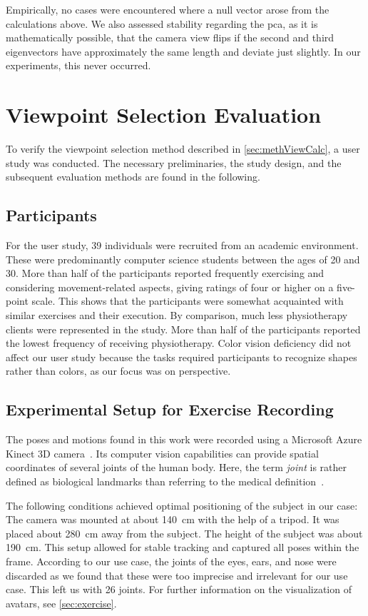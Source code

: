 Empirically, no cases were encountered where a null vector arose from the calculations above. We also assessed stability regarding the \acrshort{pca}, as it is mathematically possible, that the camera view flips if the second and third eigenvectors have approximately the same length and deviate just slightly. In our experiments, this never occurred.

\section{Viewpoint Selection Evaluation \label{sec:evaluation}}
To verify the viewpoint selection method described in \autoref{sec:methViewCalc}, a user study was conducted. The necessary preliminaries, the study design, and the subsequent evaluation methods are found in the following.

\subsection{Participants}
For the user study, 39 individuals were recruited from an academic environment. These were predominantly computer science students between the ages of 20 and 30. More than half of the participants reported frequently exercising and considering movement-related aspects, giving ratings of four or higher on a five-point scale. This shows that the participants were somewhat acquainted with similar exercises and their execution. By comparison, much less physiotherapy clients were represented in the study. More than half of the participants reported the lowest frequency of receiving physiotherapy. Color vision deficiency did not affect our user study because the tasks required participants to recognize shapes rather than colors, as our focus was on perspective.

\subsection{Experimental Setup for Exercise Recording\label{sec:recording}}
The poses and motions found in this work were recorded using a Microsoft Azure Kinect 3D camera~\cite{kinect:documentation}. Its computer vision capabilities can provide spatial coordinates of several joints of the human body. Here, the term \emph{joint} is rather defined as biological landmarks than referring to the medical definition~\cite{kinect:documentation}.

The following conditions achieved optimal positioning of the subject in our case: The camera was mounted at about 140~cm with the help of a tripod. It was placed about 280~cm away from the subject. The height of the subject was about 190~cm. This setup allowed for stable tracking and captured all poses within the frame. According to our use case, the joints of the eyes, ears, and nose were discarded as we found that these were too imprecise and irrelevant for our use case. This left us with 26 joints. For further information on the visualization of avatars, see \autoref{sec:exercise}.

